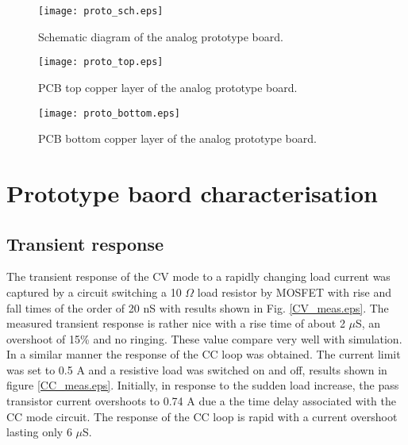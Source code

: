 \documentclass[a4paper,10pt, oneside]{article}
\begin{document}
\begin{figure}[H]
	\hspace*{-1.2cm}
	\begin{centering}
		\texttt{[image: proto\_sch.eps]}
		\caption{Schematic diagram of the analog prototype board.}\label{proto_sch}
	\end{centering}
\end{figure}

\begin{figure}[H]
	\hspace*{-0.5cm}
	\begin{centering}
		\texttt{[image: proto\_top.eps]}
		\caption{PCB top copper layer of the analog prototype board.}\label{proto_top}
	\end{centering}
\end{figure}

\begin{figure}[H]
	\hspace*{-0.5cm}
	\begin{centering}
		\texttt{[image: proto\_bottom.eps]}
		\caption{PCB bottom copper layer of the analog prototype board.}\label{proto_bottom}
	\end{centering}
\end{figure}

\section{Prototype baord characterisation}
\subsection*{Transient response}
The transient response of the CV mode to a rapidly changing load current was captured by a circuit switching a 10 $\Omega$ load resistor by MOSFET with rise and fall times of the order of 20 nS with results shown in Fig. \ref{CV_meas.eps}. The measured transient response is rather nice with a rise time of about 2 $\mu$S, an overshoot of 15\% and no ringing. These value compare very well with simulation. In a similar manner the response of the CC loop was obtained. The current limit was set to 0.5 A and a resistive load was switched on and off, results shown in figure \ref{CC_meas.eps}. Initially, in response to the sudden load increase, the pass transistor current overshoots to 0.74 A due a the time delay associated with the CC mode circuit. The response of the CC loop is rapid with a current overshoot lasting only 6 $\mu$S. 
\end{document}

